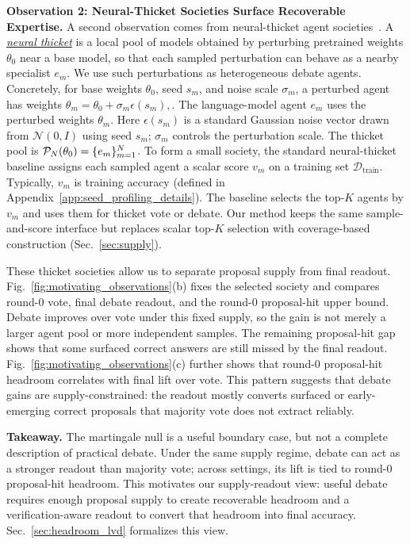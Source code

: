 \documentclass{article}
\newcommand{\secref}[1]{Sec.~\ref{#1}}
\newcommand{\figref}[1]{Fig.~\ref{#1}}
\newcommand{\appref}[1]{Appendix~\ref{#1}}
\begin{document}
\textbf{Observation 2: Neural-Thicket Societies Surface Recoverable Expertise.}
A second observation comes from neural-thicket agent societies~\citep{gan2026neuralthicketsdiversetask}.
A \underline{\emph{neural thicket}} is a local pool of models obtained by perturbing pretrained
weights $\theta_0$ near a base model, so that each sampled perturbation can
behave as a nearby specialist $e_m$.
We use such perturbations as heterogeneous debate agents. Concretely, for base
weights $\theta_0$, seed $s_m$, and noise scale $\sigma_m$, a perturbed agent has weights
$
\theta_m=\theta_0+\sigma_m\epsilon(s_m),
$.
The language-model agent $e_m$ uses the perturbed weights $\theta_m$. Here
$\epsilon(s_m)$ is a standard Gaussian noise vector drawn from
$\mathcal N(0,I)$ using seed $s_m$; $\sigma_m$ controls the perturbation
scale.
The thicket pool is
$
{\mathcal{P}}_N(\theta_0)=\{e_m\}_{m=1}^N
$.
To form a small society, the standard neural-thicket baseline assigns each
sampled agent a scalar score $v_m$ on a training set
$\mathcal D_{\mathrm{train}}$.
Typically, $v_m$ is training accuracy (defined in \appref{app:seed_profiling_details}).
The baseline selects the top-$K$ agents by $v_m$ and uses them for thicket vote
or debate. Our method keeps the same sample-and-score interface but replaces
scalar top-$K$ selection with coverage-based construction (\secref{sec:supply}).

These thicket societies allow us to separate proposal supply from final readout.
\figref{fig:motivating_observations}(b) fixes the selected society and compares
round-0 vote, final debate readout, and the round-0 proposal-hit upper bound.
Debate improves over vote under this fixed supply, so the gain is not merely a
larger agent pool or more independent samples. The remaining proposal-hit gap
shows that some surfaced correct answers are still missed by the final readout.
\figref{fig:motivating_observations}(c) further shows that round-0 proposal-hit
headroom correlates with final lift over vote. This pattern suggests that
debate gains are supply-constrained: the readout mostly converts surfaced or
early-emerging correct proposals that majority vote does not extract reliably.

\textbf{Takeaway.}
The martingale null is a useful boundary case, but not a
complete description of practical debate. Under the same supply regime, debate
can act as a stronger readout than majority vote; across settings, its lift is
tied to round-0 proposal-hit headroom. This motivates our supply-readout view:
useful debate requires enough proposal supply to create recoverable headroom
and a verification-aware readout to convert that headroom into final accuracy.
\secref{sec:headroom_lvd} formalizes this view.
\end{document}
